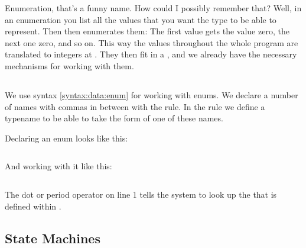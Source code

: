 Enumeration, that's a funny name. How could I possibly remember that? Well, in an enumeration you list all the values that you want the type to be able to represent. Then  then enumerates them: The first value gets the value zero, the next one zero, and so on. This way the values throughout the whole program are translated to integers at . They then fit in a , and we already have the necessary mechanisms for working with them.

\subsection{\csharp}

We use syntax \ref{syntax:data:enum} for working with enums. We declare a number of names with commas in between with the  rule. In the  rule we define a typename to be able to take the form of one of these names.

\begin{syntaxfloat}
  
  \caption{Enums}
  \label{syntax:data:enum}
\end{syntaxfloat}

Declaring an enum looks like this:

\inputminted[firstline=8]{csharp}{../src/csharp/primdata/suit/Program.cs}

And working with it like this:

\inputminted[linenos,lastline=6]{csharp}{../src/csharp/primdata/suit/Program.cs}

The dot or period operator on line 1 tells the system to look up the  that is defined within .

\subsection{State Machines}

